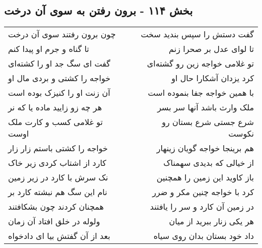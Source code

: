 \begin{center}
\section*{بخش ۱۱۴ - برون رفتن به سوی آن درخت}
\label{sec:sh114}
\begin{longtable}{l p{0.5cm} r}
چون برون رفتند سوی آن درخت
&&
گفت دستش را سپس بندید سخت
\\
تا گناه و جرم او پیدا کنم
&&
تا لوای عدل بر صحرا زنم
\\
گفت ای سگ جد او را کشته‌ای
&&
تو غلامی خواجه زین رو گشته‌ای
\\
خواجه را کشتی و بردی مال او
&&
کرد یزدان آشکارا حال او
\\
آن زنت او را کنیزک بوده است
&&
با همین خواجه جفا بنموده است
\\
هر چه زو زایید ماده یا که نر
&&
ملک وارث باشد آنها سر بسر
\\
تو غلامی کسب و کارت ملک اوست
&&
شرع جستی شرع بستان رو نکوست
\\
خواجه را کشتی باستم زار زار
&&
هم برینجا خواجه گویان زینهار
\\
کارد از اشتاب کردی زیر خاک
&&
از خیالی که بدیدی سهمناک
\\
نک سرش با کارد در زیر زمین
&&
باز کاوید این زمین را همچنین
\\
نام این سگ هم نبشته کارد بر
&&
کرد با خواجه چنین مکر و ضرر
\\
همچنان کردند چون بشکافتند
&&
در زمین آن کارد و سر را یافتند
\\
ولوله در خلق افتاد آن زمان
&&
هر یکی زنار ببرید از میان
\\
بعد از آن گفتش بیا ای دادخواه
&&
داد خود بستان بدان روی سیاه
\\
\end{longtable}
\end{center}

